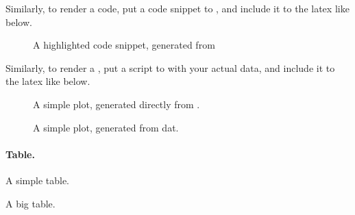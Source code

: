 Similarly, to render a code, put a code snippet to , 
and include it to the latex like below.

\begin{figure}[h]
\centering
\footnotesize

\caption{A highlighted code snippet, generated from 
}
\label{f:code}
\end{figure}

Similarly, to render a , put a 
script to  with your actual data, 
and include it to the latex like below.

\begin{figure}[h]
\centering
\footnotesize
{}
\caption{A simple plot, generated directly from .}
\label{f:gaussian}
\end{figure}

\begin{figure}[h]
\centering
\footnotesize
{}
\caption{A simple plot, generated from dat.}
\label{f:plot}
\end{figure}

\paragraph{Table.}

\begin{table}[h]
\centering
\footnotesize

\caption{A simple table.}
\label{t:simple}
\end{table}

\begin{table}[t]
\centering
\footnotesize

\caption{A big table.}
\label{t:big}
\end{table}

